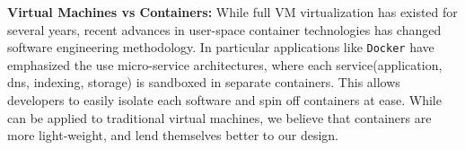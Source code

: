 \textbf{Virtual Machines vs Containers:} 
While full VM virtualization has existed for several years, recent advances in user-space container technologies has changed software engineering methodology. 
In particular applications like \texttt{Docker} have emphasized the use micro-service architectures, where each service(application, dns, indexing, storage) is sandboxed in separate containers. 
This allows developers to easily isolate each software and spin off containers at ease.
While \parikshan can be applied to traditional virtual machines, we believe that containers are more light-weight, and lend themselves better to our design.


